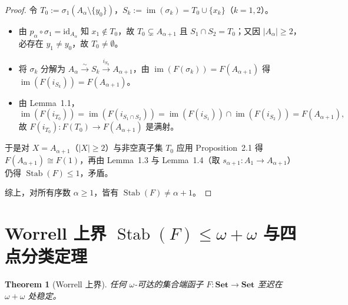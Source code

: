 \documentclass[11pt,a4paper]{ctexart}
\theoremstyle{plain}
\newtheorem{theorem}[lemma]{Theorem}
\newcommand{\Stab}{\operatorname{Stab}}
\newcommand{\im}{\operatorname{im}}
\newcommand{\id}{\mathrm{id}}
\newcommand{\Set}{\mathbf{Set}}
\begin{document}
\begin{proof}
令 $T_0 := \sigma_1(A_\alpha \setminus \{y_0\})$，$S_k := \im(\sigma_k) = T_0 \cup \{x_k\}$（$k = 1, 2$）。
\begin{itemize}[leftmargin=2em]
  \item 由 $p_\alpha \circ \sigma_1 = \id_{A_\alpha}$ 知 $x_1 \notin T_0$，故 $T_0 \subsetneq A_{\alpha+1}$ 且 $S_1 \cap S_2 = T_0$；又因 $|A_\alpha| \ge 2$，必存在 $y_1 \neq y_0$，故 $T_0 \neq \emptyset$。
  \item 将 $\sigma_k$ 分解为 $A_\alpha \xrightarrow{\sim} S_k \xrightarrow{i_{S_k}} A_{\alpha+1}$，由 $\im(F(\sigma_k)) = F(A_{\alpha+1})$ 得 $\im(F(i_{S_k})) = F(A_{\alpha+1})$。
  \item 由 Lemma~1.1，
    \[
      \im(F(i_{T_0})) = \im(F(i_{S_1 \cap S_2})) = \im(F(i_{S_1})) \cap \im(F(i_{S_2})) = F(A_{\alpha+1}),
    \]
    故 $F(i_{T_0}) : F(T_0) \to F(A_{\alpha+1})$ 是满射。
\end{itemize}
于是对 $X = A_{\alpha+1}$（$|X| \ge 2$）与非空真子集 $T_0$ 应用 Proposition~2.1 得 $F(A_{\alpha+1}) \cong F(1)$，再由 Lemma~1.3 与 Lemma~1.4（取 $s_{\alpha+1} : A_1 \to A_{\alpha+1}$）仍得 $\Stab(F) \le 1$，矛盾。

综上，对所有序数 $\alpha \ge 1$，皆有 $\Stab(F) \neq \alpha + 1$。
\end{proof}

\section{Worrell 上界 $\Stab(F) \le \omega + \omega$ 与四点分类定理}

\begin{theorem}[Worrell 上界]
任何 $\omega$-可达的集合端函子 $F : \Set \to \Set$ 至迟在 $\omega + \omega$ 处稳定。
\end{theorem}
\end{document}
